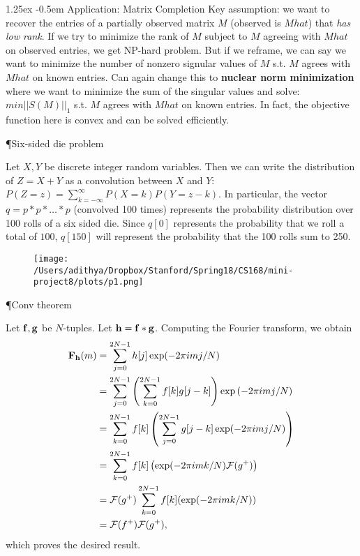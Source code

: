 \documentclass[8pt]{article}
\makeatletter
\newlength{\norm}
\newlength{\nrm}
\renewcommand{\paragraph}{%
  \@startsection{paragraph}{4}%
  {\z@}{1.25ex \@plus 2pt \@minus 2pt}{-0.5em}%
  {\fontsize{\f@size}{\nrm}\normalfont\bfseries}%
}
\makeatother
\begin{document}
\paragraph{Application: Matrix Completion} Key assumption: we want to recover the entries of a partially observed matrix $M$ (observed is $Mhat$) that \textit{has low rank}. If we try to minimize the rank of $M$ subject to $M$ agreeing with $Mhat$ on observed entries, we get NP-hard problem. But if we reframe, we can say we want to minimize the number of nonzero signular values of $M$ s.t. $M$ agrees with $Mhat$ on known entries. Can again change this to \textbf{nuclear norm minimization} where we want to minimize the sum of the singular values and solve: $min||S(M)||_1$ s.t. $M$ agrees with $Mhat$ on known entries. In fact, the objective function here is convex and can be solved efficiently. 








  \P{Six-sided die problem}

\item Let $X, Y$ be discrete integer random variables.  Then we can write the distribution of $Z = X+Y$ as a convolution between $X$ and $Y$: $P(Z = z) = \sum_{k=-\infty}^{\infty} P(X=k) P(Y = z-k)$.
        In particular, the vector $q = p * p * \dots * p$ (convolved 100 times) represents the probability distribution over 100 rolls of a six sided die.  Since $q[0]$ represents the probability that we roll a total of $100$, $q[150]$ will represent the probability that the 100 rolls sum to 250.

\begin{figure}[H]
   \centering
   \texttt{[image: /Users/adithya/Dropbox/Stanford/Spring18/CS168/mini-project8/plots/p1.png]}
\end{figure}

\P{Conv theorem}

      \item Let $\mathbf{f, g}$ be $N$-tuples.  Let $\mathbf{h} = \mathbf{f * g}$.  Computing the Fourier transform, we obtain
        \begin{align*}
          \mathbf{F}_\mathbf{h}(m) &= \sum_{j=0}^{2N-1} h[j] \exp (-2\pi i m j / N) \\
          &= \sum_{j=0}^{2N-1} \left ( \sum_{k=0}^{2N-1} f[k] g[j-k] \right ) \exp \left( -2 \pi i m j / N \right) \\
        &= \sum_{k=0}^{2N-1} f[k] \left ( \sum_{j=0}^{2N-1} g[j-k] \exp (- 2 \pi i m j / N) \right )  \\
        &= \sum_{k=0}^{2N-1} f[k] \left ( \exp (- 2 \pi i m k / N)  \mathcal{F} (g^{+}) \right )  \\
        &= \mathcal{F} (g^{+}) \sum_{k=0}^{2N-1} f[k] (\exp (-2 \pi i m k / N)) \\
        &= \mathcal{F} (f^{+}) \mathcal{F} (g^{+}),
        \end{align*}
        which proves the desired result.
\end{document}

